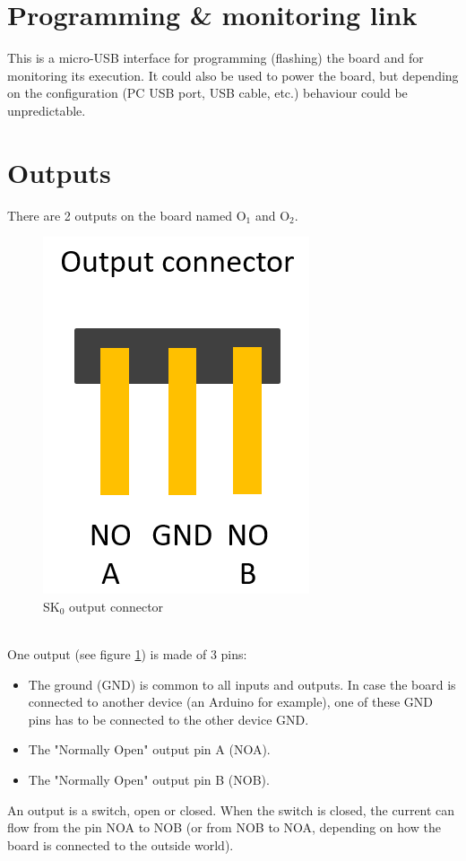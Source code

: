 \section{Programming \& monitoring link}
This is a micro-USB interface for programming (flashing) the board and for monitoring its execution. It could also be used to power the board, but depending on the configuration (PC USB port, USB cable, etc.) behaviour could be unpredictable.

\section{Outputs}
There are 2 outputs on the board named O$_1$ and O$_2$. \\
\begin{figure}[h]
\centering\includegraphics[scale=0.28]{Pictures/chapterAnnexes/sk0-output.png}
\caption{SK$_0$ output connector}
\label{annexes:SK0-output}
\end{figure}\\
One output (see figure \ref{annexes:SK0-output}) is made of 3 pins:
\begin{itemize}
    \item The ground (GND) is common to all inputs and outputs. In case the board is connected to another device (an Arduino for example), one of these GND pins has to be connected to the other device GND.
    \item The "Normally Open" output pin A (NOA).
    \item The "Normally Open" output pin B (NOB).
\end{itemize}
An output is a switch, open or closed. When the switch is closed, the current can flow from the pin NOA to NOB (or from NOB to NOA, depending on how the board is connected to the outside world).

